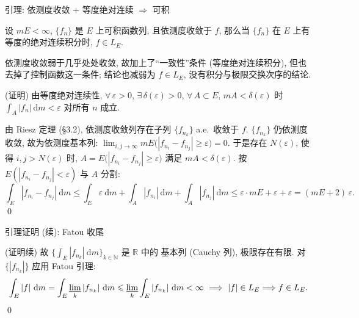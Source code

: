 
\begin{frame}{引理: 依测度收敛 $+$ 等度绝对连续 $\Rightarrow$ 可积}

\begin{lem}
设 $mE < \infty$, $\{f_n\}$ 是 $E$ 上可积函数列, 且\alert{依测度}收敛于 $f$, 那么当
$\{f_n\}$ 在 $E$ 上有等度的绝对连续积分时, $f \in L_E$.
\end{lem}

\begin{remark}
依测度收敛\alert{弱于}几乎处处收敛, 故加上了``一致性''条件 (等度绝对连续积分),
但也\alert{去掉了控制函数}这一条件; 结论也减弱为 $f \in L_E$, 没有积分与极限交换次序的结论.
\end{remark}

\startproof[bg=yellow, fg=red](证明)
由等度绝对连续性, $\forall\, \varepsilon > 0$, $\exists\, \delta(\varepsilon) > 0$,
$\forall\, A \subset E$, $mA < \delta(\varepsilon)$ 时 $\int_A |f_n| ~ \mathrm{d} m < \varepsilon$
对\alert{所有} $n$ 成立.

\pause

由 Riesz 定理 (\S 3.2), 依测度收敛列存在子列 $\{f_{n_k}\}$ a.e.\ 收敛于 $f$.
$\{f_{n_k}\}$ 仍依测度收敛, 故为依测度基本列:
$\lim_{i, j \to \infty} mE\big( |f_{n_i} - f_{n_j}| \geqslant \varepsilon \big) = 0$.
于是存在 $N(\varepsilon)$, 使得 $i, j > N(\varepsilon)$ 时,
$A = E\big( |f_{n_i} - f_{n_j}| \geqslant \varepsilon \big)$ 满足 $mA < \delta(\varepsilon)$. 按
$E(|f_{n_i} - f_{n_j}| < \varepsilon)$ 与 $A$ 分割:
\[
\int_E |f_{n_i} - f_{n_j}| ~ \mathrm{d} m
\leqslant \int_E \varepsilon ~ \mathrm{d} m
+ \int_A |f_{n_i}| ~ \mathrm{d} m
+ \int_A |f_{n_j}| ~ \mathrm{d} m
\leqslant \varepsilon \cdot mE + \varepsilon + \varepsilon
= (mE + 2)\, \varepsilon .
\]
\qed

\end{frame}


\begin{frame}{引理证明 (续): Fatou 收尾}

\startproof[bg=yellow, fg=red](证明续)
故 $\big\{ \int_E |f_{n_k}| ~ \mathrm{d} m \big\}_{k \in \mathbb{N}}$ 是 $\mathbb{R}$ 中的
\alert{基本列} (Cauchy 列), 极限存在有限. 对 $\{|f_{n_k}|\}$ 应用 Fatou 引理:
\[
\int_E |f| ~ \mathrm{d} m
= \int_E \varliminf_k |f_{n_k}| ~ \mathrm{d} m
\leqslant \varliminf_k \int_E |f_{n_k}| ~ \mathrm{d} m
< \infty
\ \Longrightarrow\ |f| \in L_E \Longrightarrow f \in L_E .
\]
\qed

\end{frame}

